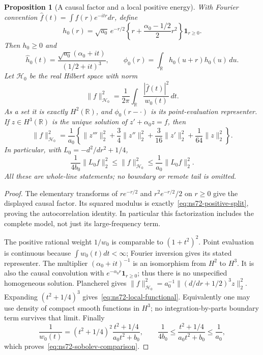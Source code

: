 \documentclass[11pt]{article}
\newtheorem{proposition}[theorem]{Proposition}
\theoremstyle{remark}
\begin{document}
\begin{proposition}[A causal factor and a local positive energy]
\label{prop:ns72-local-energy}
With Fourier convention $\widehat f(t)=\int f(r)e^{-itr}dr$, define
\[
 h_0(r)=\sqrt{a_0}\,e^{-r/2}
       \left\{r+\frac{\alpha_0-1/2}{2}r^2\right\}
       \mathbf1_{r\geq0}.
\]
Then $h_0\geq0$ and
\[
 \widehat h_0(t)=\frac{\sqrt{a_0}(\alpha_0+it)}{(1/2+it)^3},
 \qquad \phi_0(r)=\int_{\mathbb R}h_0(u+r)h_0(u)\,du.
\]
Let $\mathcal H_0$ be the real Hilbert space with norm
\[
 \|f\|_{\mathcal H_0}^2=
       \frac1{2\pi}\int_{\mathbb R}\frac{|\widehat f(t)|^2}{w_0(t)}\,dt.
\]
As a set it is exactly $H^2(\mathbb R)$, and $\phi_0(r-\cdot)$
is its point-evaluation representer. If $z\in H^3(\mathbb R)$ is the
unique solution of $z'+\alpha_0z=f$, then
\begin{equation}
 \|f\|_{\mathcal H_0}^2
 =\frac1{a_0}\left\{
 \|z'''\|_2^2+\frac34\|z''\|_2^2
               +\frac3{16}\|z'\|_2^2+\frac1{64}\|z\|_2^2\right\}.
 \label{eq:ns72-local-functional}
\end{equation}
In particular, with $L_0=-d^2/dr^2+1/4$,
\begin{equation}
 \frac1{4b_0}\|L_0f\|_2^2\leq\|f\|_{\mathcal H_0}^2
                 \leq\frac1{a_0}\|L_0f\|_2^2.
 \label{eq:ns72-sobolev-comparison}
\end{equation}
All these are whole-line statements; no boundary or remote tail is omitted.
\end{proposition}
\begin{proof}
The elementary transforms of $r e^{-r/2}$ and $r^2e^{-r/2}/2$ on
$r\geq0$ give the displayed causal factor. Its squared modulus is
exactly~\eqref{eq:ns72-positive-split}, proving the autocorrelation
identity. In particular this factorization includes the complete model,
not just its large-frequency term.

The positive rational weight $1/w_0$ is comparable to $(1+t^2)^2$.
Point evaluation is continuous because $\int w_0(t)dt<\infty$;
Fourier inversion gives its stated representer. The multiplier
$(\alpha_0+it)^{-1}$ is an isomorphism from $H^2$ to $H^3$.
It is also the causal convolution with
$e^{-\alpha_0r}\mathbf1_{r\geq0}$; thus there is no unspecified
homogeneous solution. Plancherel gives
$\|f\|_{\mathcal H_0}^2=a_0^{-1}\|(d/dr+1/2)^3z\|_2^2$.
Expanding $(t^2+1/4)^3$ gives~\eqref{eq:ns72-local-functional}.
Equivalently one may use density of compact smooth functions in $H^3$;
no integration-by-parts boundary term survives that limit.
Finally
\[
 \frac1{w_0(t)}=(t^2+1/4)^2\frac{t^2+1/4}{a_0t^2+b_0},
 \qquad \frac1{4b_0}\leq\frac{t^2+1/4}{a_0t^2+b_0}\leq\frac1{a_0},
\]
which proves~\eqref{eq:ns72-sobolev-comparison}.
\end{proof}
\end{document}
